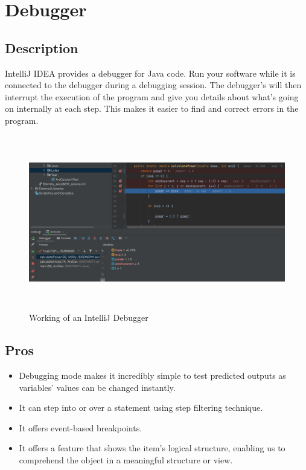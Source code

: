 \documentclass{article}
\begin{document}
    \section{Debugger}

    \subsection{Description}
    IntelliJ IDEA provides a debugger for Java code. Run your software while it is connected to the debugger during a debugging session. The debugger's will then interrupt the execution of the program and give you details about what's going on internally at each step. This makes it easier to find and correct errors in the program.
    \begin{figure}[hbt!]
        \centering
        \includegraphics[width=5.0in,height=3.0in]{Images/Debugger.png}
        \caption{Working of an IntelliJ Debugger}
        \label{fig:Speed vs. Torque from Pittman}
    \end{figure}

    \subsection{Pros}
    \begin{itemize}
        \item Debugging mode makes it incredibly simple to test predicted outputs as variables' values can be changed instantly.
        \item It can step into or over a statement using step filtering technique.
        \item It offers event-based breakpoints.
        \item It offers a feature that shows the item's logical structure, enabling us to comprehend the object in a meaningful structure or view.
    \end{itemize}
\end{document}

